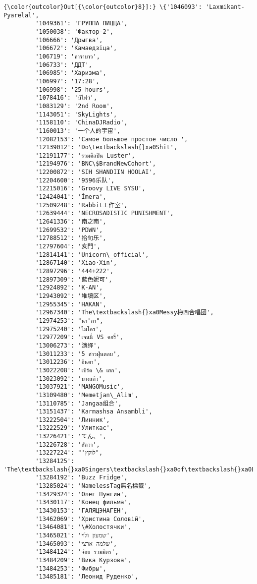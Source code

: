 \documentclass[11pt]{ctexart}
\begin{document}
\begin{Verbatim}[commandchars=\\\{\}]
{\color{outcolor}Out[{\color{outcolor}8}]:} \{'1046093': 'Laxmikant-Pyarelal',
         '1049361': 'ГРУППА ПИЦЦА',
         '1050038': 'Фактор-2',
         '106666': 'Дрыгва',
         '106672': 'Камаедзiца',
         '106719': 'คาราบาว',
         '106733': 'ДДТ',
         '106985': 'Харизма',
         '106997': '17:28',
         '106998': '25 hours',
         '1078416': 'บีไฟว์',
         '1083129': '2nd Room',
         '1143051': 'SkyLights',
         '1158110': 'ChinaDJRadio',
         '1160013': '一个人的宇宙',
         '12082153': 'Самое большое простое число ',
         '12139012': 'Do\textbackslash{}xa0Shit',
         '12191177': 'รวมศิลปิน Luster',
         '12194976': 'BNC\$BrandNewCohort',
         '12200872': 'SIH SHANDIIN HOOLAI',
         '12204600': '9596乐队',
         '12215016': 'Groovy LIVE SYSU',
         '12424041': 'İmera',
         '12509248': 'Rabbit工作室',
         '12639444': 'NECROSADISTIC PUNISHMENT',
         '12641336': '南之南',
         '12699532': 'PDWN',
         '12788512': '拾旬乐',
         '12797604': '亥門',
         '12814141': 'Unicorn\_official',
         '12867140': 'Xiao·Xin',
         '12897296': '444+222',
         '12897309': '蓝色妮可',
         '12924892': 'K-AN',
         '12943092': '堆填区',
         '12955345': 'HAKAN',
         '12967340': 'The\textbackslash{}xa0Messy梅西合唱团',
         '12974253': "นา'กา",
         '12975240': 'ไมโคร',
         '12977209': 'เจนนี่ VS คอรี่',
         '13006273': '演绎',
         '13011233': '5 สาวฝุ่นตลบ',
         '13012236': 'อินคา',
         '13022208': 'เบิร์ด \& เสก',
         '13023092': 'บางแก้ว',
         '13037921': 'MANGOMusic',
         '13109480': 'Memetjan\_Alim',
         '13110785': 'Jangaa组合',
         '13151437': 'Karmashsa Ansambli',
         '13222504': 'Линник',
         '13222529': 'Улиткас',
         '13226421': 'てん、',
         '13226728': 'สักวา',
         '13227224': "'לוקץ",
         '13284125': 'The\textbackslash{}xa0Singers\textbackslash{}xa0of\textbackslash{}xa0Lights',
         '13284192': 'Buzz Fridge',
         '13285024': 'NamelessTag無名標籤',
         '13429324': 'Олег Пунгин',
         '13430117': 'Конец фильма',
         '13430153': 'ГАЛЯЦЭНАГЕН',
         '13462069': 'Христина Соловій',
         '13464081': '\#Холостячки',
         '13465021': 'שמעון ולוי',
         '13465093': 'שלמה ארצי',
         '13484124': 'จ่อย รวมมิตร',
         '13484209': 'Вика Курзова',
         '13484253': 'Фибры',
         '13485181': 'Леонид Руденко',

\end{Verbatim}
\end{document}
